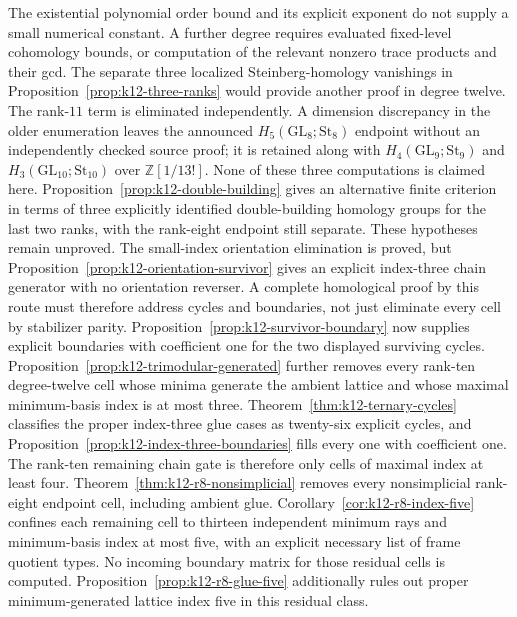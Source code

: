 \documentclass[11pt,a4paper]{article}
\theoremstyle{definition}
\begin{document}
The existential polynomial order bound and its explicit exponent do
not supply a small numerical constant. A further degree
requires evaluated fixed-level cohomology bounds, or computation of the
relevant nonzero trace products and their gcd. The separate three localized
Steinberg-homology vanishings in Proposition~\ref{prop:k12-three-ranks}
would provide another proof in degree twelve.
The rank-$11$ term is eliminated independently. A dimension discrepancy
in the older enumeration leaves the announced $H_5(\mathrm{GL}_8;\mathrm{St}_8)$
endpoint without an independently checked source proof; it is retained
along with $H_4(\mathrm{GL}_9;\mathrm{St}_9)$ and
$H_3(\mathrm{GL}_{10};\mathrm{St}_{10})$ over $\mathbb Z[1/13!]$.
None of these three computations is claimed here.
Proposition~\ref{prop:k12-double-building} gives an alternative finite
criterion in terms of three explicitly identified double-building
homology groups for the last two ranks, with the rank-eight endpoint
still separate. These hypotheses remain unproved.
The small-index orientation elimination is proved, but
Proposition~\ref{prop:k12-orientation-survivor} gives an explicit
index-three chain generator with no orientation reverser. A complete
homological proof by this route must therefore address cycles and boundaries, not
just eliminate every cell by stabilizer parity.
Proposition~\ref{prop:k12-survivor-boundary} now supplies explicit
boundaries with coefficient one for the two displayed surviving
cycles. Proposition~\ref{prop:k12-trimodular-generated} further removes
every rank-ten degree-twelve cell whose minima generate the ambient
lattice and whose maximal minimum-basis index is at most three.
Theorem~\ref{thm:k12-ternary-cycles} classifies the proper index-three
glue cases as twenty-six explicit cycles, and
Proposition~\ref{prop:k12-index-three-boundaries} fills every one
with coefficient one. The rank-ten remaining chain gate is therefore
only cells of maximal index at least four.
Theorem~\ref{thm:k12-r8-nonsimplicial} removes every nonsimplicial
rank-eight endpoint cell, including ambient glue.
Corollary~\ref{cor:k12-r8-index-five} confines each remaining cell
to thirteen independent minimum rays and minimum-basis index at
most five, with an explicit necessary list of frame quotient types.
No incoming boundary matrix for those residual cells is computed.
Proposition~\ref{prop:k12-r8-glue-five} additionally rules out
proper minimum-generated lattice index five in this residual class.
\end{document}
